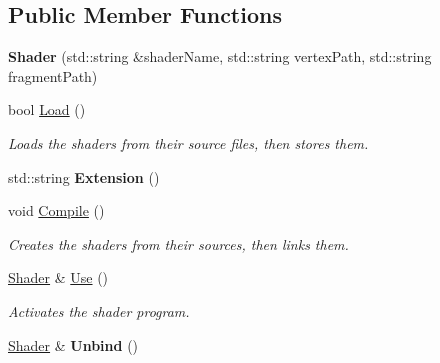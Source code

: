 \subsection*{Public Member Functions}
\begin{DoxyCompactItemize}
\item 
\hypertarget{classDCEngine_1_1Shader_ad0d7f5935e1cb3495d2fe3e062928cfb}{{\bfseries Shader} (std\-::string \&shader\-Name, std\-::string vertex\-Path, std\-::string fragment\-Path)}\label{classDCEngine_1_1Shader_ad0d7f5935e1cb3495d2fe3e062928cfb}

\item 
bool \hyperlink{classDCEngine_1_1Shader_a2c47c302081a2308f65e7771f13d3185}{Load} ()
\begin{DoxyCompactList}\small\item\em Loads the shaders from their source files, then stores them. \end{DoxyCompactList}\item 
\hypertarget{classDCEngine_1_1Shader_a20064de5a8890488fccce1d28ab4bd94}{std\-::string {\bfseries Extension} ()}\label{classDCEngine_1_1Shader_a20064de5a8890488fccce1d28ab4bd94}

\item 
\hypertarget{classDCEngine_1_1Shader_adaf51ad219535e947d34e40787bd34c1}{void \hyperlink{classDCEngine_1_1Shader_adaf51ad219535e947d34e40787bd34c1}{Compile} ()}\label{classDCEngine_1_1Shader_adaf51ad219535e947d34e40787bd34c1}

\begin{DoxyCompactList}\small\item\em Creates the shaders from their sources, then links them. \end{DoxyCompactList}\item 
\hypertarget{classDCEngine_1_1Shader_ac898d312f2783c0bbe65443fdfb66a3f}{\hyperlink{classDCEngine_1_1Shader}{Shader} \& \hyperlink{classDCEngine_1_1Shader_ac898d312f2783c0bbe65443fdfb66a3f}{Use} ()}\label{classDCEngine_1_1Shader_ac898d312f2783c0bbe65443fdfb66a3f}

\begin{DoxyCompactList}\small\item\em Activates the shader program. \end{DoxyCompactList}\item 
\hypertarget{classDCEngine_1_1Shader_a813b9fcde13eb0324b05523f8ec32939}{\hyperlink{classDCEngine_1_1Shader}{Shader} \& {\bfseries Unbind} ()}\label{classDCEngine_1_1Shader_a813b9fcde13eb0324b05523f8ec32939}


\end{DoxyCompactItemize}
